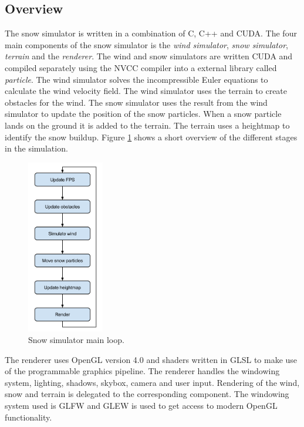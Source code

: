 \subsection{Overview}

The snow simulator is written in a combination of C, C++ and CUDA.
The four main components of the snow simulator is the \emph{wind simulator}, 
\emph{snow simulator}, \emph{terrain} and the \emph{renderer}. The wind and 
snow simulators are written CUDA and compiled separately using the NVCC compiler 
into a external library called \emph{particle}. The wind simulator 
solves the incompressible Euler equations to calculate the wind velocity field. 
The wind simulator uses the terrain to create obstacles for the wind. The snow 
simulator uses the result from the wind simulator to update the position of the 
snow particles. When a snow particle lands on the ground it is added to the terrain.
The terrain uses a heightmap to identify the snow buildup. Figure \ref{fig:mainLoop} 
shows a short overview of the different stages in the simulation. 

\begin{figure}[ht]
	\center
	\includegraphics[width=0.30\textwidth]{images/snow_sim_main_loop}
	\caption{Snow simulator main loop.}
	\label{fig:mainLoop}
\end{figure}

The renderer uses OpenGL version 4.0 and shaders written in GLSL to make use of 
the programmable graphics pipeline. The renderer handles the windowing system, 
lighting, shadows, skybox, camera and user input. Rendering of the wind, snow and 
terrain is delegated to the corresponding component. The windowing system used 
is GLFW and GLEW is used to get access to modern OpenGL functionality. 

